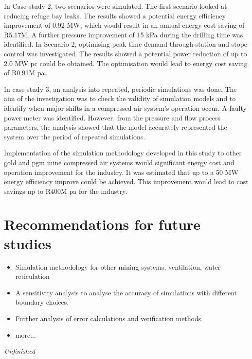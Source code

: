 	 \par
	 In Case study 2, two scenarios were simulated. The first scenario looked at reducing refuge bay leaks. The results showed a potential energy efficiency improvement of 0.92 MW, which would result in an annual energy cost saving of R5.17M. A further pressure improvement of 15 kPa during the drilling time was identified. In Scenario 2, optimising peak time demand through station and stope control was investigated. The results showed a potential power reduction of up to 2.0 MW \gls{pc} could be obtained. The optimisation would lead to energy cost saving of R0.91M \gls{pa}.
	 \par 
	 In case study 3, an analysis into repeated, periodic simulations was done. The aim of the investigation was to check the validity of simulation models and to identify when major shifts in a compressed air system's operation occur. A faulty power meter was identified. However, from the pressure and flow process parameters, the analysis showed that the model accurately represented the system over the period of repeated simulations.
	 \par
	 Implementation of the simulation methodology developed in this study to other gold and \gls{pgm} mine compressed air systems would significant energy cost and operation improvement for the industry. It was estimated that up to a 50 MW energy efficiency improve could be achieved. This improvement would lead to cost savings up to R400M \gls{pa} for the industry. 
	 \section{Recommendations for future studies}
	 \begin{itemize}
	 	\item Simulation methodology for other mining systems, ventilation, water reticulation 
	 	\item A sensitivity analysis to analyse the accuracy of simulations with different boundary choices.
	 	\item Further analysis of error calculations and verification methods.
	 	\item more...
	 	
	 \end{itemize}
	 \textit{Unfinished}
	 
